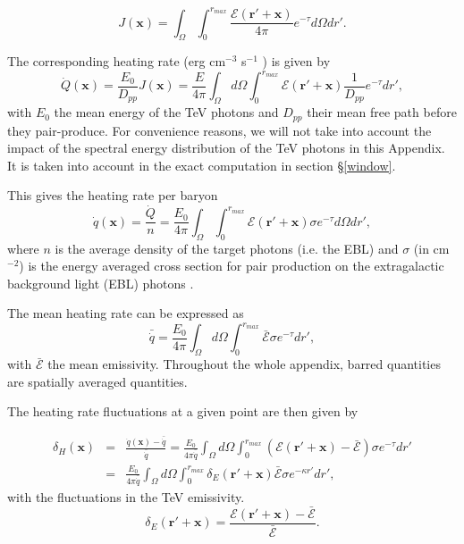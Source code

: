 \documentclass[onecolumn]{emulateapj}
\begin{document}
\begin{equation}
  \label{eq:flux_recu}
  J(\mathbf{x})=\int_{\Omega}\int_0^{r_{max}}   \frac{\mathcal{E}(\mathbf{r}'+\mathbf{x}) }{4\pi } e^{-\tau} d\Omega dr'.
\end{equation}

The corresponding heating rate (erg cm$^{-3}$ s$^{-1}$ ) is given by 
\begin{equation}
  \label{eq:heating_rate0}
  \dot{Q}(\mathbf{x})=\frac{E_0}{D_{pp}}J(\mathbf{x}) =\frac{E}{4\pi}   \int_{\Omega}d\Omega\int_0^{r_{max}}   \mathcal{E}(\mathbf{r}'+\mathbf{x}) \frac{1}{D_{pp}}  e^{-\tau} dr' ,
\end{equation}
with $E_0$ the mean energy of the TeV photons and $D_{pp}$ their mean free path  before they pair-produce. For convenience reasons,  we will not take into account the impact of the spectral energy distribution of the TeV photons in this Appendix. It is taken into account in the exact computation in section \S\ref{window}.

This gives the  heating rate per baryon
\begin{equation}
  \label{eq:heating_rate0}
  \dot{q}(\mathbf{x})=\frac{\dot{Q}}{n}= \frac{E_0}{4\pi}  \int_{\Omega}\int_0^{r_{max}}   \mathcal{E}(\mathbf{r}'+\mathbf{x})\sigma  e^{-\tau}d\Omega dr' ,
\end{equation}
where $n$ is the average density of the target photons (i.e. the EBL) and $\sigma$ (in cm$^{-2}$) is the energy averaged cross section for pair production on the extragalactic background light (EBL) photons \citep{1967PhRv..155.1408G}. 


The mean heating rate can be expressed as
\begin{equation}
  \label{eq:heating_rate0}
  \bar{\dot{q}}=\frac{E_0}{4\pi} \int_{\Omega}d\Omega\int_0^{r_{max}}  \bar{\mathcal{E}}\sigma  e^{-\tau}dr', 
\end{equation}
with $\bar{\mathcal{E}}$ the mean emissivity. Throughout the whole appendix, barred quantities are spatially averaged quantities.

The heating rate fluctuations at a given point are then given by 

\begin{eqnarray}
  \label{eq:heat_fluc_newt0}
  \delta_H(\mathbf{x})&=&\frac{\dot{q}(\mathbf{x})-\bar{\dot{q}}}{\bar{\dot{q}}}=\frac{E_0}{4\pi\bar{\dot{q}}} \int_{\Omega}d\Omega\int_0^{r_{max}}   (\mathcal{E}(\mathbf{r}'+\mathbf{x})-\bar{\mathcal{E}}) \sigma  e^{-\tau} dr' \\ \nonumber
  &=&\frac{E_0}{4\pi\bar{\dot{q}}}\int_{\Omega}d\Omega\int_0^{r_{max}}   \delta_E(\mathbf{r}'+\mathbf{x})\bar{\mathcal{E}}\sigma  e^{-\kappa r'}dr',
\end{eqnarray}
with the fluctuations in the TeV emissivity.
\begin{equation}
  \label{eq:fluc_emissivity}
  \delta_E(\mathbf{r}'+\mathbf{x})=\frac{\mathcal{E}(\mathbf{r'}+\mathbf{x})-\bar{\mathcal{E}}}{\bar{\mathcal{E}}}.
\end{equation}
\end{document}
